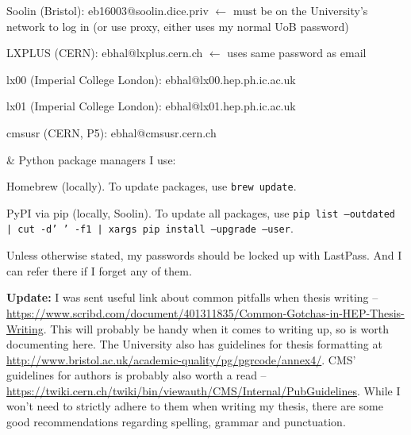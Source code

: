 \begin{easylist}[itemize]
\quad Soolin (Bristol): eb16003@soolin.dice.priv $\leftarrow$ must be on the University's network to log in (or use proxy, either uses my normal UoB password)

\quad LXPLUS (CERN): ebhal@lxplus.cern.ch $\leftarrow$ uses same password as email

\quad lx00 (Imperial College London): ebhal@lx00.hep.ph.ic.ac.uk

\quad lx01 (Imperial College London): ebhal@lx01.hep.ph.ic.ac.uk

\quad cmsusr (CERN, P5): ebhal@cmsusr.cern.ch


& Python package managers I use:

\quad Homebrew (locally). To update packages, use \texttt{brew update}.

\quad PyPI via pip (locally, Soolin). To update all packages, use \texttt{pip list --outdated | cut -d' ' -f1 | xargs pip install --upgrade --user}.

\end{easylist}


Unless otherwise stated, my passwords should be locked up with LastPass. And I can refer there if I forget any of them.

\textbf{Update:} I was sent useful link about common pitfalls when thesis writing -- \url{https://www.scribd.com/document/401311835/Common-Gotchas-in-HEP-Thesis-Writing}. This will probably be handy when it comes to writing up, so is worth documenting here. The University also has guidelines for thesis formatting at \url{http://www.bristol.ac.uk/academic-quality/pg/pgrcode/annex4/}. CMS' guidelines for authors is probably also worth a read -- \url{https://twiki.cern.ch/twiki/bin/viewauth/CMS/Internal/PubGuidelines}. While I won't need to strictly adhere to them when writing my thesis, there are some good recommendations regarding spelling, grammar and punctuation.
